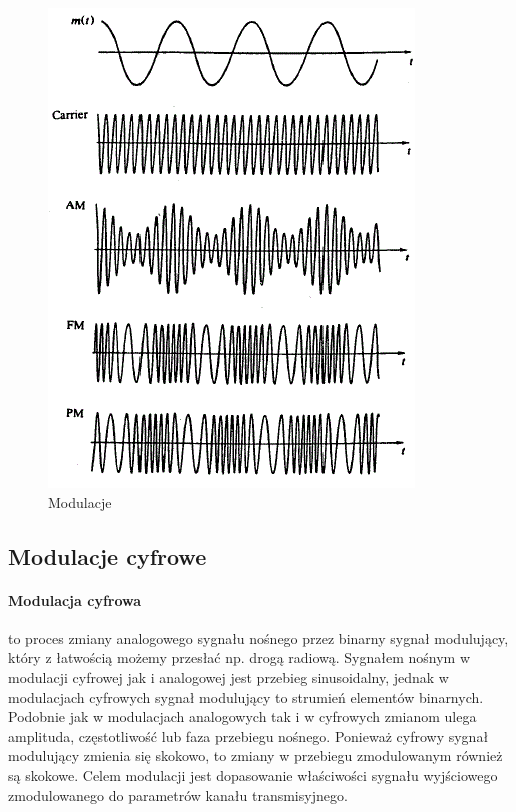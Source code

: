 \documentclass[a4paper,twoside]{report}
\begin{document}
\begin{figure}[htbp]
\centering
\includegraphics[scale=1]{obrazy/modulacje.png}
\caption{Modulacje}
\label{rys:modulacje}
\end{figure}

 
\subsection{Modulacje cyfrowe}
\paragraph{Modulacja cyfrowa} to proces zmiany analogowego sygnału nośnego przez binarny sygnał modulujący, który z łatwością możemy przesłać np. drogą radiową. Sygnałem nośnym w modulacji cyfrowej jak i analogowej jest przebieg sinusoidalny, jednak w modulacjach cyfrowych sygnał modulujący to strumień elementów binarnych. Podobnie jak w modulacjach analogowych tak i w cyfrowych zmianom ulega amplituda, częstotliwość lub faza przebiegu nośnego. Ponieważ cyfrowy sygnał modulujący zmienia się skokowo, to zmiany w przebiegu zmodulowanym również są skokowe. Celem modulacji jest dopasowanie właściwości sygnału wyjściowego zmodulowanego do parametrów kanału transmisyjnego.
\end{document}

